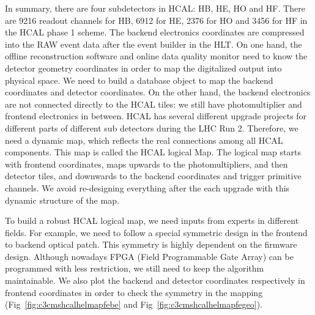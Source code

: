 In summary, there are four subdetectors in HCAL: HB, HE, HO and HF. There are 9216 readout channels for HB, 6912 for HE, 2376 for HO and 3456 for HF in the HCAL phase 1 scheme. The backend electronics coordinates are compressed into the RAW event data after the event builder in the HLT. On one hand, the offline reconstruction software and online data quality monitor need to know the detector geometry coordinates in order to map the digitalized output into physical space. We need to build a database object to map the backend coordinates and detector coordinates. On the other hand, the backend electronics are not connected directly to the HCAL tiles: we still have photomultiplier and frontend electronics in between. HCAL has several different upgrade projects for different parts of different sub detectors during the LHC Run 2. Therefore, we need a dynamic map, which reflects the real connections among all HCAL components. This map is called the HCAL logical Map. The logical map starts with frontend coordinates, maps upwards to the photomultipliers, and then detector tiles, and downwards to the backend coordinates and trigger primitive channels. We avoid re-designing everything after the each upgrade with this dynamic structure of the map. 

To build a robust HCAL logical map, we need inputs from experts in different fields. For example, we need to follow a special symmetric design in the frontend to backend optical patch. This symmetry is highly dependent on the firmware design. Although nowadays FPGA (Field Programmable Gate Array) can be programmed with less restriction, we still need to keep the algorithm maintainable. We also plot the backend and detector coordinates respectively in frontend coordinates in order to check the symmetry in the mapping (Fig~\ref{fig:c3cmshcalhelmapfebe} and Fig~\ref{fig:c3cmshcalhelmapfegeo}).

